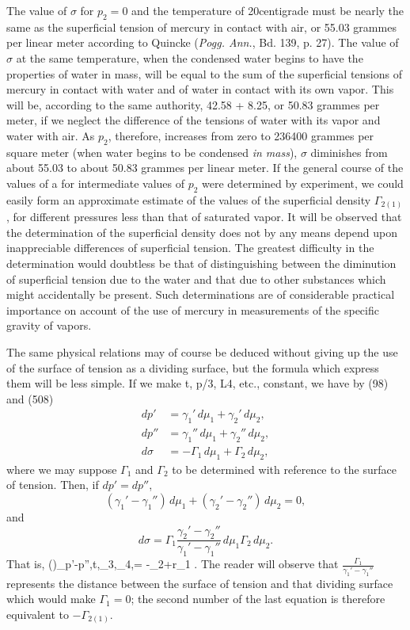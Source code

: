 \documentclass[12pt]{memoir}
\begin{document}
{{The value of $\sigma$ for $p_2=0$ and the temperature of 20\degree  centigrade must be nearly the same as the superficial tension of mercury in contact with air, or 55.03 grammes per linear meter according to Quincke (\textit{Pogg. Ann.}, Bd. 139, p. 27). The value of $\sigma$ at the same temperature, when the condensed water begins to have the properties of water in mass, will be equal to the sum of the superficial tensions of mercury in contact with water and of water in contact with its own vapor. This will be, according to the same authority, 42.58 + 8.25, or 50.83 grammes per meter, if we neglect the difference of the tensions of water with its vapor and water with air. As $p_2$, therefore, increases from zero to 236400 grammes per square meter (when water begins to be condensed \textit{in mass}), $\sigma$ diminishes from about 55.03 to about 50.83 grammes per linear meter. If the general course of the values of a for intermediate values of $p_2$ were determined by experiment, we could easily form an approximate estimate of the values of the superficial density $\Gamma_{2(1)}$, for different pressures less than that of saturated vapor. It will be observed that the determination of the superficial density does not by any means depend upon inappreciable differences of superficial tension. The greatest difficulty in the determination would doubtless be that of distinguishing between the diminution of superficial tension due to the water and that due to other substances which might accidentally be present. Such determinations are of considerable practical importance on account of the use of mercury in measurements of the specific gravity of vapors.}

The same physical relations may of course be deduced without giving up the use of the surface of tension as a dividing surface, but the formula which express them will be less simple. If we make t, p/3, L4, etc., constant, we have by (98) and (508)
\begin{align*}dp' &= \gamma_1'\, d\mu_1 + \gamma_2'\, d\mu_2, \\
dp'' &= \gamma_1''\, d\mu_1 + \gamma_2''\, d\mu_2, \\
d\sigma &= -\Gamma_1\, d\mu_1 + \Gamma_2\, d\mu_2,\end{align*}
where we may suppose $\Gamma_1$ and $\Gamma_2$ to be determined with reference to the surface of tension. Then, if $dp'=dp''$,
$$ (\gamma_1' - \gamma_1'')\, d\mu_1 + (\gamma_2' - \gamma_2'')\, d\mu_2  = 0, $$
and
$$ d\sigma = \Gamma_1 \frac{\gamma_2' - \gamma_2''}{\gamma_1' - \gamma_1''}\, d\mu_1   \Gamma_2\, d\mu_2.$$
That is,
\eqs \left(\right)_{p'-p'',t,\mu_3,\mu_4,}= -\Gamma_2+r\Gamma_1 . \label{515}\eqe
The reader will observe that $\frac{\Gamma_1}{\gamma_1' - \gamma_1''}$ represents the distance between the surface of tension and that dividing surface which would make $\Gamma_1 =0$; the second number of the last equation is therefore equivalent to $- \Gamma_{2(1)}$.

}
\end{document}
